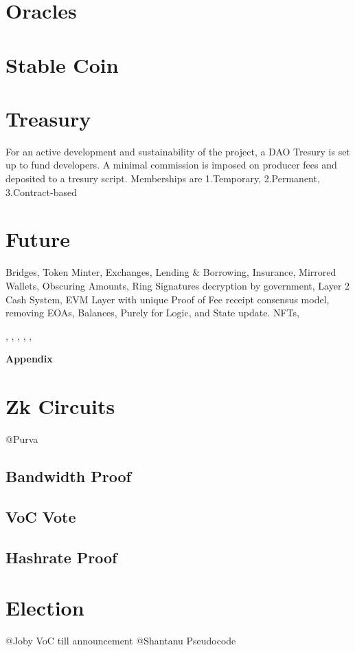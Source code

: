 \documentclass[a4paper,10pt]{article}
\begin{document}
\section{Oracles}
\section{Stable Coin}
\section{Treasury}
For an active development and sustainability of the project, a DAO Tresury is set up to fund developers. A minimal commission is imposed on producer fees and deposited to a tresury script. Memberships are 1.Temporary, 2.Permanent, 3.Contract-based
\section{Future}
Bridges, Token Minter, Exchanges, Lending \& Borrowing, Insurance, Mirrored Wallets, Obscuring Amounts, Ring Signatures decryption by government, Layer 2 Cash System, EVM Layer with unique Proof of Fee receipt consensus model, removing EOAs, Balances, Purely for Logic, and State update. NFTs,\\
\begin{center}
\nocite{nakamoto2008bitcoin}, \nocite{poon2016bitcoin} , \nocite{yakovenko2018solana}, \nocite{wood2014ethereum}, \nocite{rai2020}, \nocite{Stateful}
\end{center}


\vspace{5mm}
\appendix
\noindent \Large \textbf{Appendix}
\normalsize
\section{Zk Circuits}
@Purva
\subsection{Bandwidth Proof}
\subsection{VoC Vote}
\subsection{Hashrate Proof}
\section{Election}
@Joby VoC till announcement
@Shantanu Pseudocode
\end{document}

